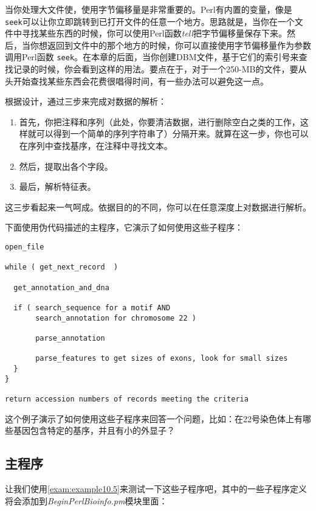 当你处理大文件使，使用字节偏移量是非常重要的。Perl有内置的变量，像是 \verb|seek|可以让你立即跳转到已打开文件的任意一个地方。思路就是，当你在一个文件中寻找某些东西的时候，你可以使用Perl函数\textit{tell}把字节偏移量保存下来。然后，当你想返回到文件中的那个地方的时候，你可以直接使用字节偏移量作为参数调用Perl函数 \verb|seek|。在本章的后面，当你创建DBM文件，基于它们的索引号来查找记录的时候，你会看到这样的用法。要点在于，对于一个250-MB的文件，要从头开始查找某些东西会花费很唱得时间，有一些办法可以避免这一点。

根据设计，通过三步来完成对数据的解析：

\begin{enumerate}
  \item 首先，你把注释和序列（此处，你要清洁数据，进行删除空白之类的工作，这样就可以得到一个简单的序列字符串了）分隔开来。就算在这一步，你也可以在序列中查找基序，在注释中寻找文本。
  \item 然后，提取出各个字段。
  \item 最后，解析特征表。
\end{enumerate}

这三步看起来一气呵成。依据目的的不同，你可以在任意深度上对数据进行解析。

下面使用伪代码描述的主程序，它演示了如何使用这些子程序：

\begin{lstlisting}
open_file 

while ( get_next_record  )

  get_annotation_and_dna

  if ( search_sequence for a motif AND 
       search_annotation for chromosome 22 )

       parse_annotation

       parse_features to get sizes of exons, look for small sizes
  }
}

return accession numbers of records meeting the criteria
\end{lstlisting}

这个例子演示了如何使用这些子程序来回答一个问题，比如：在22号染色体上有哪些基因包含特定的基序，并且有小的外显子？
  
\subsection{主程序}
让我们使用\autoref{exam:example10.5}来测试一下这些子程序吧，其中的一些子程序定义将会添加到\textit{BeginPerlBioinfo.pm}模块里面：
  


